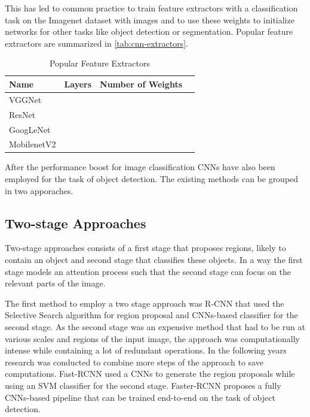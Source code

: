 	This has led to common practice to train feature extractors with a classification task on the Imagenet dataset with  images and to use these weights to initialize networks for other tasks like object detection or segmentation. Popular feature extractors are summarized in \autoref{tab:cnn-extractors}.
	
	\begin{table}[htbp]
		\centering
		\caption{Popular Feature Extractors}
		\begin{tabular}{l|l|l|l}
			Name & Layers & Number of Weights &  \\ \hline
			VGGNet &  &  &  \\ \hline
			ResNet &  &  &  \\ \hline
			GoogLeNet &  &  &  \\ \hline
			MobilenetV2 &  &  &
		\end{tabular}
		\label{tab:cnn-extractors}
	\end{table}

	After the performance boost for image classification \acp{CNN} have also been employed for the task of object detection. The existing methods can be grouped in two apporaches.
	
	
	\subsection{Two-stage Approaches}
	
	Two-stage approaches consists of a first stage that proposes regions, likely to contain an object and second stage that classifies these objects. In a way the first stage models an attention process such that the second stage can focus on the relevant parts of the image.
	
	The first method to employ a two stage approach was R-CNN that used the Selective Search algorithm for region proposal and \acp{CNN}-based classifier for the second stage. As the second stage was an expensive method that had to be run at various scales and regions of the input image, the approach was computationally intense while containing a lot of redundant operations. In the following years research was conducted to combine more steps of the approach to save computations. Fast-RCNN \cite{Ren} used a \acp{CNN} to generate the region proposals while using an SVM classifier for the second stage. Faster-RCNN \cite{Ren2015} proposes a fully \acp{CNN}-based pipeline that can be trained end-to-end on the task of object detection.
	
